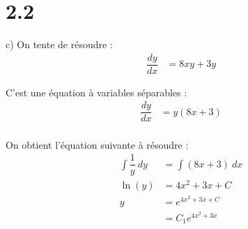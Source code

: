 \section*{2.2}

c) On tente de résoudre :
\begin{align*}
    \dfrac{dy}{dx} &= 8xy +3y
\end{align*}

C'est une équation à variables séparables :
\begin{align*}
    \dfrac{dy}{dx} &= y(8x +3) \\
\end{align*}

On obtient l'équation suivante à résoudre :
\begin{align*}
    \int{\dfrac{1}{y}\ dy} &= \int{(8x +3)\ dx} \\
    \ln(y) &= 4x^2 + 3x + C \\
    y &= e^{4x^2 + 3x + C} \\
    &= C_1 e^{4x^2 + 3x}
\end{align*}
